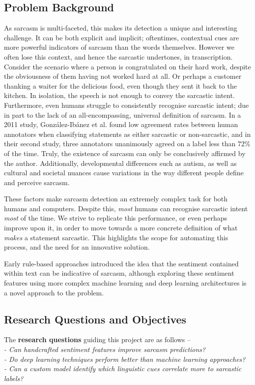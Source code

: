 \documentclass[12pt,a4paper]{article}
\begin{document}
\subsection{Problem Background}
\noindent As sarcasm is multi-faceted, this makes its detection a unique and interesting challenge. It can be both explicit and implicit; oftentimes, contextual cues are more powerful indicators of sarcasm than the words themselves. However we often lose this context, and hence the sarcastic undertones, in transcription. Consider the scenario where a person is congratulated on their hard work, despite the obviousness of them having not worked hard at all. Or perhaps a customer thanking a waiter for the delicious food, even though they sent it back to the kitchen. In isolation, the speech is not enough to convey the sarcastic intent. Furthermore, even humans struggle to consistently recognise sarcastic intent; due in part to the lack of an all-encompassing, universal definition of sarcasm. In a 2011 study, Gonz{\'a}lez-Ib{\'a}nez et al. \cite{gonzalez2011identifying} found low agreement rates between human annotators when classifying statements as either sarcastic or non-sarcastic, and in their second study, three annotators unanimously agreed on a label less than 72\% of the time. Truly, the existence of sarcasm can only be conclusively affirmed by the author. Additionally, developmental differences such as autism, as well as cultural and societal nuances cause variations in the way different people define and perceive sarcasm.

These factors make sarcasm detection an extremely complex task for both humans and computers. Despite this, \textit{most} humans can recognise sarcastic intent \textit{most} of the time. We strive to replicate this performance, or even perhaps improve upon it, in order to move towards a more concrete definition of what \textit{makes} a statement sarcastic. This highlights the scope for automating this process, and the need for an innovative solution.

Early rule-based approaches introduced the idea that the sentiment contained within text can be indicative of sarcasm, although exploring these sentiment features using more complex machine learning and deep learning architectures is a novel approach to the problem.

\subsection{Research Questions and Objectives}
\noindent The \textbf{research questions} guiding this project are as follows --\\
\indent \textit{- Can handcrafted sentiment features improve sarcasm predictions?}\\ 
\indent \textit{- Do deep learning techniques perform better than machine learning approaches?}\\ 
\indent \textit{- Can a custom model identify which linguistic cues correlate more to sarcastic labels?}\\
\end{document}
